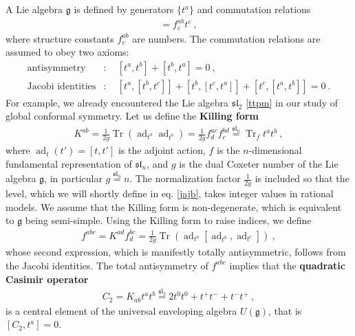 \documentclass[12pt, a4paper, notitlepage, twoside]{report}
\numberwithin{equation}{section}
\theoremstyle{break}
\begin{document}
A Lie algebra $\mathfrak{g}$ is defined by generators $\{t^a\}$ and commutation relations 
\begin{align}
 [t^a,t^b] = f^{ab}_c t^c \ ,
\label{ttft}
\end{align}
where structure constants $f^{ab}_c$ are numbers.
The commutation relations are assumed to obey two axioms:
\begin{align}
 \text{antisymmetry} & : \quad [t^a,t^b] + [t^b,t^a] = 0\ ,
\\
\text{Jacobi identities} & : \quad  [t^a,[t^b,t^c]] + [t^b,[t^c,t^a]] + [t^c,[t^a,t^b]] = 0 \ .
\end{align}
For example, we already encountered the Lie algebra $\mathfrak{sl}_2$ \eqref{ttpm} in our study of global conformal symmetry.
Let us define the \textbf{\boldmath Killing form} 
\begin{align}
 K^{ab} = \frac{1}{2g} \operatorname{Tr} \left(\operatorname{ad}_{t^a}\operatorname{ad}_{t^b}\right) =\frac{1}{2g} f^{ac}_d f^{bd}_c \overset{\mathfrak{sl}_n}{=}\operatorname{Tr}_f t^at^b\ ,
\end{align}
where  $\operatorname{ad}_t(t') = [t,t']$ is the adjoint action, $f$ is the $n$-dimensional fundamental representation of $\mathfrak{sl}_n$, and $g$ is the dual Coxeter number of the Lie algebra $\mathfrak{g}$, in particular $g\overset{\mathfrak{sl}_n}{=}n$.
The normalization factor $\frac{1}{2g}$ is included so that the level, which we will shortly define in eq. \eqref{jajb}, takes integer values in rational models.
We assume that the Killing form is non-degenerate, which is equivalent to $\mathfrak{g}$ being semi-simple. 
Using the Killing form to raise indices, we define
\begin{align}
 f^{abc} = K^{ad}f_d^{bc} = \frac{1}{2g}\operatorname{Tr}\left( \operatorname{ad}_{t^a} [\operatorname{ad}_{t^b}, \operatorname{ad}_{t^c}] \right)\ ,
\end{align}
whose second expression, which is manifestly totally antisymmetric, follows from the Jacobi identities.
The total antisymmetry of $f^{abc}$ implies that the \textbf{\boldmath quadratic Casimir operator}
\begin{align}
 C_2 = K_{ab} t^a t^b \overset{\mathfrak{sl}_2}{=} 2t^0t^0+ t^+t^-+t^-t^+\ ,
\label{ctk}
\end{align}
is a central element of the universal enveloping algebra $U(\mathfrak{g})$, that is $[C_2,t^a]=0$.
\end{document}
